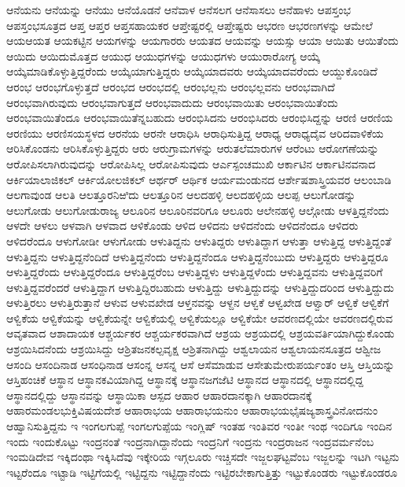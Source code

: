 {ಆನೆಯನು
ಆನೆಯನ್ನು
ಆನೆಯು
ಆನೆಯೊಡನೆ
ಆನೆವಾಳ
ಆನೆಸಲಗ
ಆನೆಸಾಸಲು
ಆನೆಹಾಳು
ಆಪಸ್ತಂಭ
ಆಪಸ್ತಂಭಸೂತ್ರದ
ಆಪ್ತ
ಆಪ್ತರ
ಆಪ್ತಸಹಾಯಕರ
ಆಪ್ತೇಷ್ಟರಲ್ಲಿ
ಆಪ್ತೇಷ್ಟರು
ಆಭರಣ
ಆಭರಣಗಳನ್ನು
ಆಮೇಲೆ
ಆಯಆಯತ
ಆಯಕಟ್ಟಿನ
ಆಯಗಳನ್ನು
ಆಯಗಾರರು
ಆಯತದ
ಆಯವನ್ನು
ಆಯಸ್ಸು
ಆಯಾ
ಆಯಿತು
ಆಯಿತೆಂದು
ಆಯಿದು
ಆಯಿದುಮೊತ್ತದ
ಆಯುಧ
ಆಯುಧಗಳನ್ನು
ಆಯುಧಗಳು
ಆಯುರಾರೋಗ್ಯ
ಆಯ್ಕೆ
ಆಯ್ಕೆಮಾಡಿಕೊಳ್ಳುತ್ತಿದ್ದರೆಂದು
ಆಯ್ಕೆಯಾಗುತ್ತಿದ್ದರು
ಆಯ್ಕೆಯಾದವರು
ಆಯ್ಕೆಯಾದವರೆಂದು
ಆಯ್ದುಕೊಂಡಿದೆ
ಆರಂಭ
ಆರಂಭಗೊಳ್ಳುತ್ತದೆ
ಆರಂಭದ
ಆರಂಭದಲ್ಲಿ
ಆರಂಭಲ್ಲನು
ಆರಂಭಲ್ಲವನು
ಆರಂಭವಾಗಿದೆ
ಆರಂಭವಾಗಿರುವುದು
ಆರಂಭವಾಗುತ್ತದೆ
ಆರಂಭವಾದುದು
ಆರಂಭವಾಯಿತು
ಆರಂಭವಾಯಿತೆಂದು
ಆರಂಭವಾಯಿತೆಂದೂ
ಆರಂಭವಾಯಿತೆನ್ನಬಹುದು
ಆರಂಭಿಸಿದನು
ಆರಂಭಿಸಿದರು
ಆರಂಭಿಸಿದ್ದನ್ನು
ಆರಣಿ
ಆರಣಿಯ
ಆರಣಿಯು
ಆರಣಿಸಯಸ್ಥಳದ
ಆರನೆಯ
ಆರನೇ
ಆರಾಧಿಸಿ
ಆರಾಧಿಸುತ್ತಿದ್ದ
ಆರಾಧ್ಯ
ಆರಾಧ್ಯದೈವ
ಆರಿದವಾಳಿಕೆಯ
ಆರಿಸಿಕೊಂಡನು
ಆರಿಸಿಕೊಳ್ಳುತ್ತಿದ್ದರು
ಆರು
ಆರುಗ್ರಾಮಗಳನ್ನು
ಆರುತಲೆಮಾರುಗಳ
ಆರೆಂಟು
ಆರೋಗಣೆಯನ್ನು
ಆರೋಪಿಸಲಾಗಿರುವುದನ್ನು
ಆರೋಪಿಸಿಲ್ಲ
ಆರೋಪಿಸುವುದು
ಆರ್ಎಸ್ಪಂಚಮುಖಿ
ಆರ್ಕಾಟಿನ
ಆರ್ಕಾಟಿನವನಾದ
ಆರ್ಕಿಯಾಲಾಜಿಕಲ್
ಆರ್ಕಿಯೋಲಜಿಕಲ್
ಆರ್ಥರ್
ಆರ್ಥಿಕ
ಆರ್ಯಮಂಡುನದ
ಆರ್ಶೇಷಶಾಸ್ತ್ರಿಯವರ
ಆಲಂಬಾಡಿ
ಆಲಗಾವುಂಡ
ಆಲತಿ
ಆಲತ್ತೂರನಿಱಿದು
ಆಲತ್ತೂರಿನ
ಆಲದಹಳ್ಳಿ
ಆಲದಹಳ್ಳಿಯ
ಆಲಪ್ಪ
ಆಲುಗೋಡನ್ನು
ಆಲುಗೋಡು
ಆಲುಗೋಡುರಾಜ್ಯ
ಆಲೂರಿನ
ಆಲೂರಿನವರಿಗೂ
ಆಲೂರು
ಆಲೇನಹಳ್ಳಿ
ಆಲ್ಗೋಡು
ಆಳತ್ತಿದ್ದನೆಂದು
ಆಳದೇ
ಆಳಲು
ಆಳವಾಗಿ
ಆಳವಾದ
ಆಳಿಕೊಂಡು
ಆಳಿದ
ಆಳಿದನು
ಆಳಿದನೆಂದು
ಆಳಿದನೆಂದೂ
ಆಳಿದರು
ಆಳಿದರೆಂದೂ
ಆಳುಗೋಡೀ
ಆಳುಗೋಡು
ಆಳುತಿದ್ದನು
ಆಳುತಿದ್ದರು
ಆಳುತಿದ್ದಾಗ
ಆಳುತ್ತಾ
ಆಳುತ್ತಿದ್ದ
ಆಳುತ್ತಿದ್ದಂತೆ
ಆಳುತ್ತಿದ್ದನು
ಆಳುತ್ತಿದ್ದನೆಂದಿದೆ
ಆಳುತ್ತಿದ್ದನೆಂದು
ಆಳುತ್ತಿದ್ದನೆಂದೂ
ಆಳುತ್ತಿದ್ದನೆಂಬುದು
ಆಳುತ್ತಿದ್ದರು
ಆಳುತ್ತಿದ್ದರೂ
ಆಳುತ್ತಿದ್ದರೆಂದು
ಆಳುತ್ತಿದ್ದರೆಂದೂ
ಆಳುತ್ತಿದ್ದರೆಂಬ
ಆಳುತ್ತಿದ್ದಳು
ಆಳುತ್ತಿದ್ದಳೆಂದು
ಆಳುತ್ತಿದ್ದವನು
ಆಳುತ್ತಿದ್ದವರಿಗೆ
ಆಳುತ್ತಿದ್ದವರೆಂದರೆ
ಆಳುತ್ತಿದ್ದಾಗ
ಆಳುತ್ತಿದ್ದಿರಬಹುದು
ಆಳುತ್ತಿದ್ದು
ಆಳುತ್ತಿದ್ದುದನ್ನು
ಆಳುತ್ತಿದ್ದುದರಿಂದ
ಆಳುತ್ತಿದ್ದುದು
ಆಳುತ್ತಿರಲು
ಆಳುತ್ತಿರುತ್ತಾನೆ
ಆಳುವ
ಆಳುವಖೇಡ
ಆಳ್ತನವನ್ನು
ಆಳ್ದನ
ಆಳ್ವಕೆ
ಆಳ್ವಖೇಡ
ಆಳ್ವಾರ್
ಆಳ್ವಿಕೆ
ಆಳ್ವಿಕೆಗೆ
ಆಳ್ವಿಕೆಯ
ಆಳ್ವಿಕೆಯನ್ನು
ಆಳ್ವಿಕೆಯನ್ನೇ
ಆಳ್ವಿಕೆಯಲ್ಲಿ
ಆಳ್ವಿಕೆಯಲ್ಲೂ
ಆಳ್ವಿಕೆಯೇ
ಆವರಣದಲ್ಲಿಯೇ
ಆವರಣದಲ್ಲಿರುವ
ಆವೃತವಾದ
ಆಶಾದಾಯಕ
ಆಶ್ಚರ್ಯಕರ
ಆಶ್ಚರ್ಯಕರವಾಗಿದೆ
ಆಶ್ರಯ
ಆಶ್ರಯದಲ್ಲಿ
ಆಶ್ರಯವರ್ತಿಯಾಗಿದ್ದುಕೊಂಡು
ಆಶ್ರಯಿಸಿದನೆಂದು
ಆಶ್ರಯಿಸಿದ್ದು
ಆಶ್ರಿತಜನಕಲ್ಪವೃಕ್ಷ
ಆಶ್ರಿತನಾಗಿದ್ದು
ಆಶ್ವಲಾಯನ
ಆಶ್ವಲಾಯನಸೂತ್ರದ
ಆಶ್ವೀಜ
ಆಸಂದಿ
ಆಸಂದಿನಾಡ
ಆಸಂಧಿನಾಡ
ಆಸಂನ್ನ
ಆಸನ್ನ
ಆಸೆ
ಆಸೆಮಾಡುವ
ಆಸೇತುಮೇರುಪರ್ಯಂತಂ
ಆಸ್ತಿ
ಆಸ್ತಿಯನ್ನು
ಆಸ್ತಿಹಂಚಿಕೆ
ಆಸ್ಥಾನ
ಆಸ್ಥಾನಕವಿಯಾಗಿದ್ದ
ಆಸ್ಥಾನಕ್ಕೆ
ಆಸ್ಥಾನಜಗಜೆಟಿ
ಆಸ್ಥಾನದ
ಆಸ್ಥಾನದಲ್ಲಿ
ಆಸ್ಥಾನದಲ್ಲಿದ್ದ
ಆಸ್ಥಾನದಲ್ಲಿದ್ದು
ಆಸ್ಥಾನವನ್ನು
ಆಸ್ಥಾಯಿಕಾ
ಆಸ್ಪದ
ಆಹಾರ
ಆಹಾರದಾನಕ್ಕಾಗಿ
ಆಹಾರದಾನಕ್ಕೆ
ಆಹಾರಮಂಡಲಭುಕ್ತಿವಿಷಯದೇಶ
ಆಹಾರಾಭಯ
ಆಹಾರಾಭಯನುಂ
ಆಹಾರಾಭಯಭೈಷಜ್ಯಶಾಸ್ತ್ರವಿನೋದನುಂ
ಆಹ್ವಾನಿಸುತ್ತಿದ್ದನು
ಇ
ಇಂಗಲಗುಪ್ಪೆ
ಇಂಗಲಗುಪ್ಪೆಯ
ಇಂಗ್ಲಿಷ್
ಇಂತಹ
ಇಂತಿವರ
ಇಂತೀ
ಇಂಥ
ಇಂದಿಗೂ
ಇಂದಿನ
ಇಂದು
ಇಂದುಕೊಟ್ಟು
ಇಂದ್ರನಂತೆ
ಇಂದ್ರನಾಗಿದ್ದಾನೆಂದು
ಇಂದ್ರನಿಗೆ
ಇಂದ್ರನು
ಇಂದ್ರರಾಜನ
ಇಂದ್ರವರ್ಮನೆಂಬ
ಇಂಮಡಿದೇವ
ಇಕ್ಕಿದಂಥಾ
ಇಕ್ಕಿಸಿದೆವು
ಇಕ್ಕೇರಿಯ
ಇಗ್ಗಲೂರು
ಇಚ್ಚಿಸದೇ
ಇಜ್ಜಲಘಟ್ಟವೆಂಬ
ಇಜ್ಜಲನ್ನು
ಇಟಗಿ
ಇಟ್ಟನು
ಇಟ್ಟರೆಂದೂ
ಇಟ್ಟಾಡಿ
ಇಟ್ಟಿಗೆಯಲ್ಲಿ
ಇಟ್ಟಿದ್ದನು
ಇಟ್ಟಿದ್ದಾನೆಂದು
ಇಟ್ಟಿರಬೇಕಾಗುತ್ತಿತ್ತು
ಇಟ್ಟುಕೊಂಡರು
ಇಟ್ಟುಕೊಂಡರೂ
}
